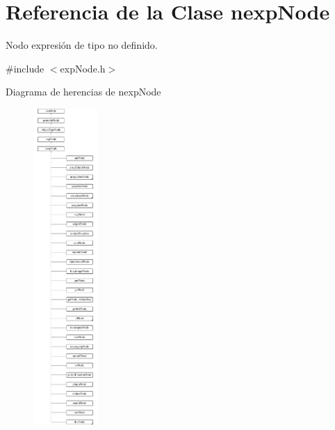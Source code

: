\hypertarget{classnexpNode}{\section{Referencia de la Clase nexp\-Node}
\label{classnexpNode}
}


Nodo expresión de tipo no definido.  




{\ttfamily \#include $<$exp\-Node.\-h$>$}

Diagrama de herencias de nexp\-Node\begin{figure}[H]
\begin{center}
\leavevmode
\includegraphics[height=12.000000cm]{classnexpNode}
\end{center}
\end{figure}
